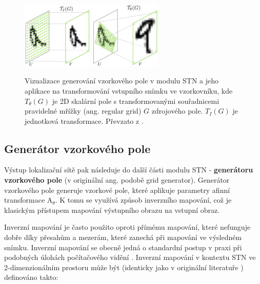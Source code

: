 \begin{figure}[h]
\centering
\includegraphics[width=0.3\textwidth,keepaspectratio]{Figures/stn/stn_a.png}
\includegraphics[width=0.3\textwidth,keepaspectratio]{Figures/stn/stn_b.png}
\caption[Vizualizace generování vzorkového pole v modulu STN]
{Vizualizace generování vzorkového pole v modulu STN a jeho aplikace na transformování vstupního snímku ve vzorkovníku, kde $T_{\theta}(G)$ je 2D skalární pole s transformovanými souřadnicemi pravidelné mřížky (ang. regular grid) $G$ zdrojového pole. $T_{I}(G)$ je jednotková transformace. Převzato z \cite{stn}. }
\label{fig:stn_grid}
\end{figure}

\subsection{Generátor vzorkového pole}

Výstup lokalizační sítě pak následuje do další části modulu STN - \textbf{generátoru vzorkového pole} (v originální ang. podobě grid generator). Generátor vzorkového pole generuje vzorkové pole, které aplikuje parametry afinní transformace ${\displaystyle \mathrm {A} }_\theta$. K tomu se využívá způsob inverzního mapování, což je klasickým přístupem mapování výstupního obrazu na vstupní obraz.

Inverzní mapování je často použito oproti přímému mapování, které nefunguje dobře díky přesahům a mezerám, které zanechá při mapování ve výsledném snímku. Inverzní mapování se obecně jedná o standardní postup v praxi při podobných úlohách počítačového vidění \cite{stn_medium_1}. Inverzní mapování v kontextu STN ve 2-dimenzionálním prostoru může být (identicky jako v originální literatuře \cite{stn}) definováno takto:

